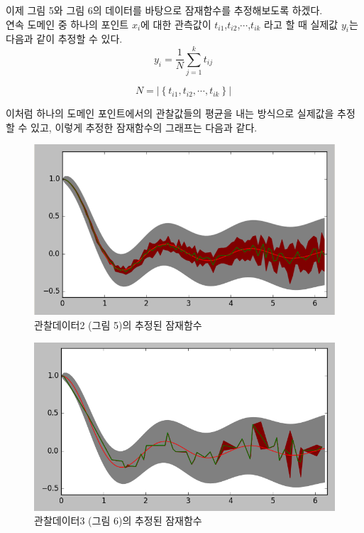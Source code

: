 \documentclass[a4paper]{oblivoir}
\begin{document}
이제 그림 5와 그림 6의 데이터를 바탕으로 잠재함수를 추정해보도록 하겠다.\\
연속 도메인 중 하나의 포인트 $x_i$에 대한 관측값이 $t_{i1}$,$t_{i2}$,$\cdots$,$t_{ik}$ 라고 할 때 실제값 $y_{i}$는 다음과 같이 추정할 수 있다.\\

\begin{equation}
y_{i} = \frac{1}{N}\sum_{j=1}^{k}t_{ij}\
\label{eq:12-3} 
\end{equation} 

\begin{equation}
N=|\left\{t_{i1},t_{i2},\cdots,t_{ik}\right\}|\
\label{eq:12-4}
\end{equation} 

이처럼 하나의 도메인 포인트에서의 관찰값들의 평균을 내는 방식으로 실제값을 추정할 수 있고, 이렇게 추정한 잠재함수의 그래프는 다음과 같다.\\

\begin{figure}[ht] \centering 
\includegraphics[scale=0.58]{fig12_8.png} 
\caption{관찰데이터2 (그림 5)의 추정된 잠재함수}
\label{fig:12-7}
\end{figure}

\begin{figure}[ht] \centering 
\includegraphics[scale=0.58]{fig12_9.png} 
\caption{관찰데이터3 (그림 6)의 추정된 잠재함수}
\label{fig:12-8}
\end{figure}
\end{document}

